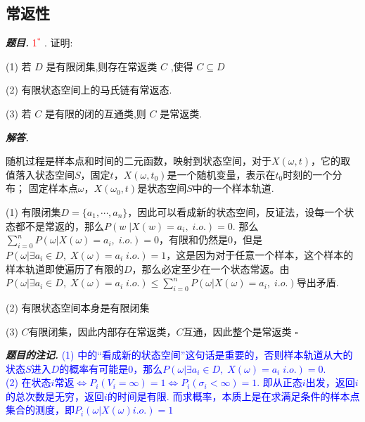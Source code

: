 \documentclass[10pt, a4paper, oneside]{ctexart}
\newenvironment{problem}{\begin{framed}\par\noindent\textbf{\textit{题目. }}}{\end{framed}\par}
\newenvironment{solution}{%
  \par\noindent\textbf{\textit{解答. }}\ignorespaces
}{%
  \hfill\ensuremath{\square}\par %
}
\newenvironment{note}{\par\noindent\textbf{\textit{题目的注记. }}\ignorespaces}{\par}
\begin{document}
\subsection{常返性}

\begin{problem}
\textcolor{red}{1$^*$  }. 证明:

(1) 若 $D$ 是有限闭集,则存在常返类 $C$ ,使得 $C \subseteq D$

(2) 有限状态空间上的马氏链有常返态.

(3) 若 $C$ 是有限的闭的互通类,则 $C$ 是常返类.   
\end{problem}
\begin{solution}
随机过程是样本点和时间的二元函数，映射到状态空间，对于$X(\omega,t)$，它的取值落入状态空间$S$，固定$t$，$X(\omega,t_0)$是一个随机变量，表示在$t_0$时刻的一个分布； 固定样本点$\omega$，$X(\omega_0,t)$是状态空间$S$中的一个样本轨道.

(1) 有限闭集$D=\{a_1,\cdots,a_n\}$，因此可以看成新的状态空间，反证法，设每一个状态都不是常返的，那么$P(w\;|X(w)=a_i, \;i.o.)=0$. 那么$\sum_{i=0}^n P(\omega| X(\omega)=a_i,\;i.o.)=0$，有限和仍然是$0$，但是$P(\omega| \exists a_i \in D, \; X(\omega)=a_i\; i.o.)=1$，这是因为对于任意一个样本，这个样本的样本轨道即使遍历了有限的$D$，那么必定至少在一个状态常返。由$P(\omega| \exists a_i \in D, \; X(\omega)=a_i\; i.o.)\leq \sum_{i=0}^n P(\omega| X(\omega)=a_i,\;i.o.)$导出矛盾.

(2) 有限状态空间本身是有限闭集

(3) $C$有限闭集，因此内部存在常返类，$C$互通，因此整个是常返类
\end{solution}

\begin{note}
\textcolor{blue}{(1) 中的“看成新的状态空间”这句话是重要的，否则样本轨道从大的状态$S$进入$D$的概率有可能是$0$，那么$P(\omega| \exists a_i \in D, \; X(\omega)=a_i\; i.o.)=0$.\\(2) 在状态$i$常返$\iff P_i(V_i=\infty)=1\iff P_i(\sigma_i<\infty)=1$. 即从正态$i$出发，返回$i$的总次数是无穷，返回$i$的时间是有限. 而求概率，本质上是在求满足条件的样本点集合的测度，即$P_i(\omega|X(\omega) i.o.)=1$}
\end{note}
\end{document}
